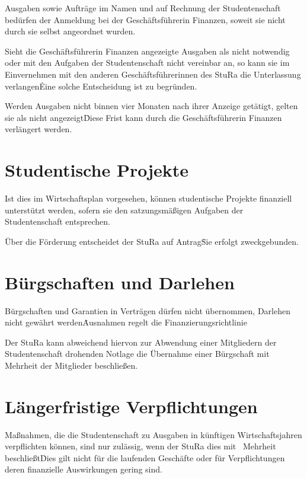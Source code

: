 \begin{multicols}{2}
\Abs \Satz Ausgaben sowie Aufträge im Namen und auf Rechnung der Studentenschaft bedürfen der Anmeldung bei der Geschäftsführerin Finanzen, soweit sie nicht durch sie selbst angeordnet wurden.

\Abs \Satz Sieht die Geschäftsführerin Finanzen angezeigte Ausgaben als nicht notwendig oder mit den Aufgaben der Studentenschaft nicht vereinbar an, so kann sie im Einvernehmen mit den anderen Geschäftsführerinnen des StuRa die Unterlassung verlangen\. Eine solche Entscheidung ist zu begründen.

\Abs \Satz Werden Ausgaben nicht binnen vier Monaten nach ihrer Anzeige getätigt, gelten sie als nicht angezeigt\. Diese Frist kann durch die Geschäftsführerin Finanzen verlängert werden.



\section{Studentische Projekte}

\Abs \Satz Ist dies im Wirtschaftsplan vorgesehen, können studentische Projekte finanziell unterstützt werden, sofern sie den satzungsmäßigen Aufgaben der Studentenschaft entsprechen.

\Abs \Satz Über die Förderung entscheidet der StuRa auf Antrag\. Sie erfolgt zweckgebunden.



\section{Bürgschaften und Darlehen}

\Abs \Satz Bürgschaften und Garantien in Verträgen dürfen nicht übernommen, Darlehen nicht gewährt werden\. Ausnahmen regelt die Finanzierungsrichtlinie

\Abs \Satz Der StuRa kann abweichend hiervon zur Abwendung einer Mitgliedern der Studentenschaft drohenden Notlage die Übernahme einer Bürgschaft mit Mehrheit der Mitglieder beschließen.



\section{Längerfristige Verpflichtungen}

\Abs \Satz Maßnahmen, die die Studentenschaft zu Ausgaben in künftigen Wirtschaftsjahren verpflichten können, sind nur zulässig, wenn der StuRa dies mit ~Mehrheit beschließt\. Dies gilt nicht für die laufenden Geschäfte oder für Verpflichtungen deren finanzielle Auswirkungen gering sind.




\end{multicols}
